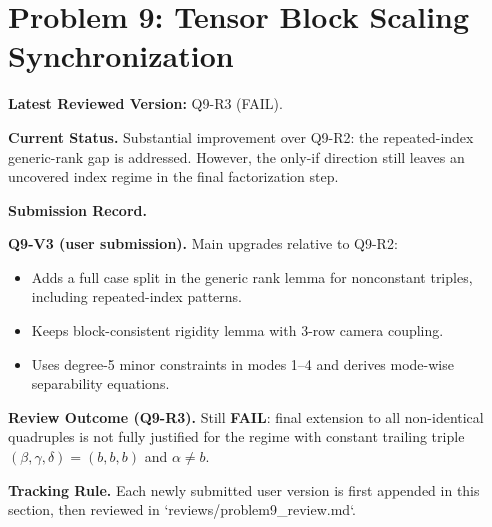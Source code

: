 \section{Problem 9: Tensor Block Scaling Synchronization}

\textbf{Latest Reviewed Version:} Q9-R3 (FAIL).

\textbf{Current Status.}
Substantial improvement over Q9-R2: the repeated-index generic-rank gap is addressed. However, the only-if direction still leaves an uncovered index regime in the final factorization step.

\textbf{Submission Record.}

\textbf{Q9-V3 (user submission).}
Main upgrades relative to Q9-R2:
\begin{itemize}
\item Adds a full case split in the generic rank lemma for nonconstant triples, including repeated-index patterns.
\item Keeps block-consistent rigidity lemma with 3-row camera coupling.
\item Uses degree-5 minor constraints in modes 1--4 and derives mode-wise separability equations.
\end{itemize}

\textbf{Review Outcome (Q9-R3).}
Still \textbf{FAIL}: final extension to all non-identical quadruples is not fully justified for the regime with constant trailing triple $(\beta,\gamma,\delta)=(b,b,b)$ and $\alpha\neq b$.

\textbf{Tracking Rule.}
Each newly submitted user version is first appended in this section, then reviewed in `reviews/problem9_review.md`.
